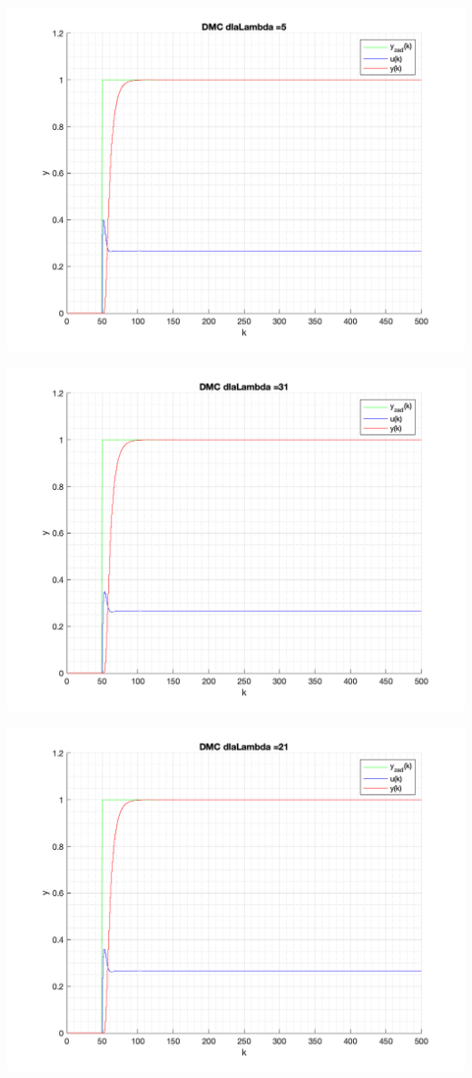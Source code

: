 \documentclass[a4paper, 11pt]{article}
\begin{document}
\begin{enumerate}
 \includegraphics[width=\linewidth]{./ModelsP4_Lambda/P4_DMC_Lambda_5_png.png} 
 
 \includegraphics[width=\linewidth]{./ModelsP4_Lambda/P4_DMC_Lambda_31_png.png} 
 
 \includegraphics[width=\linewidth]{./ModelsP4_Lambda/P4_DMC_Lambda_21_png.png} 
 

\end{enumerate}
\end{document}
